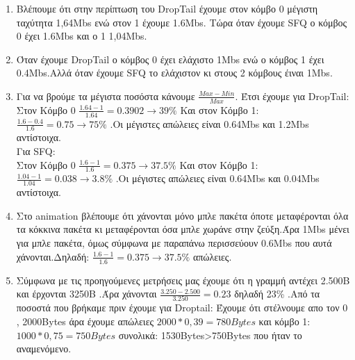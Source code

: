 \documentclass{article}
\begin{document}
\begin{enumerate}
\item   
\begin{figure}[ht!]
	\centering
		
\end{figure}
Βλέπουμε ότι στην περίπτωση του DropTail έχουμε στον κόμβο 0 μέγιστη ταχύτητα 1,64Mbs ενώ στον 1 έχουμε 1.6Mbs.
Τώρα όταν έχουμε SFQ ο κόμβος 0 έχει 1.6Mbs και ο 1 1,04Mbs.
\item
Όταν έχουμε DropTail ο κόμβος 0 έχει ελάχιστο 1Mbs ενώ ο κόμβος 1 έχει 0.4Mbs.Αλλά όταν έχουμε SFQ το ελάχιστον κι στους 2 κόμβους έιναι 1Mbs.
\item 
Για να βρούμε τα μέγιστα ποσόστα κάνουμε $\frac{Max-Min}{Max}$.
Έτσι έχουμε για DropTail:\\ Στον Κόμβο 0 $\frac{1.64-1}{1.64}=0.3902\rightarrow 39\%$  Και στον Κόμβο 1: $\frac{1.6-0.4}{1.6}=0.75\rightarrow 75\%$ .Οι μέγιστες απώλειες είναι 0.64Mbs και 1.2Mbs αντίστοιχα.\\
Για SFQ:\\
 Στον Κόμβο 0 $\frac{1.6-1}{1.6}=0.375\rightarrow 37.5\%$  Και στον Κόμβο 1: $\frac{1.04-1}{1.04}=0.038\rightarrow 3.8\%$ .Οι μέγιστες απώλειες είναι 0.64Mbs και 0.04Mbs αντίστοιχα.
\item
Στο animation βλέπουμε ότι χάνονται μόνο μπλε πακέτα όποτε μεταφέρονται όλα τα κόκκινα πακέτα κι μεταφέρονται όσα μπλε χωράνε στην ζεύξη.Άρα 1Mbs μένει για μπλε πακέτα, όμως σύμφωνα με παραπάνω περισσεύουν 0.6Mbs που αυτά χάνονται.Δηλαδή: $\frac{1.6-1}{1.6}=0.375\rightarrow37.5\%$ απώλειες. 
\item
Σύμφωνα με τις προηγούμενες μετρήσεις μας έχουμε ότι η γραμμή αντέχει 2.500Β και έρχονται 3250Β .Άρα χάνονται $\frac{3.250-2.500}{3.250}=0.23$ δηλαδή 23\% .Από τα ποσοστά που βρήκαμε πριν έχουμε για Droptail: Έχουμε ότι στέλνουμε απο τον 0 , 2000Bytes άρα έχουμε απώλειες $2000*0,39=780Bytes$ και κόμβο 1: $1000*0,75=750Bytes$ συνολικά: 1530Bytes>750Bytes που ήταν το αναμενόμενο.


\end{enumerate}
\end{document}
